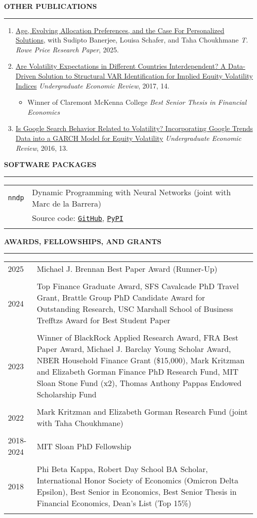 \documentclass[a4paper, 10pt]{article}
\newcounter{mycounter}
\newcommand{\cvsec}[1]
{
	\needspace{2\baselineskip}
	\noindent \textbf{#1}
	
	\vspace{2pt}
	
	\hrule
	
	\bigskip
}
\newcommand{\cvitem}[2]{#1 & #2 \\ & \\}
\newenvironment{cvchrono}[1]
{
	\cvsec{#1}
	\begin{tabu} to \linewidth {X[1,l]X[6,l]} 
}
{
	\end{tabu}
}
\newenvironment{cvcontinue}[1]
{
	\cvsec{#1}
	\begin{enumerate}
		\setcounter{enumi}{\themycounter}
	}
	{
	\setcounter{mycounter}{\theenumi}
	\end{enumerate}
}
\begin{document}
\begin{cvcontinue}{OTHER PUBLICATIONS}
	\item \href{http://timhdesilva.github.io/files/papers/trp_white_paper.pdf}{Age, Evolving Allocation Preferences, and the Case For Personalized Solutions}, with Sudipto Banerjee, Louisa Schafer, and Taha Choukhmane \newline \emph{T. Rowe Price Research Paper}, 2025.
	\item \href{https://digitalcommons.iwu.edu/uer/vol14/iss1/8/}{Are Volatility Expectations in Different Countries Interdependent? A Data-Driven Solution to Structural VAR Identification for Implied Equity Volatility Indices} \newline \emph{Undergraduate Economic Review}, 2017, 14.
	\begin{itemize}
		\item Winner of Claremont McKenna College \emph{Best Senior Thesis in Financial Economics}
	\end{itemize}
	\item \href{https://digitalcommons.iwu.edu/uer/vol13/iss1/13/}{Is Google Search Behavior Related to Volatility? Incorporating Google Trends Data into a GARCH Model for Equity Volatility} \newline \emph{Undergraduate Economic Review}, 2016, 13.\\
\end{cvcontinue}

\begin{cvchrono}{SOFTWARE PACKAGES}
	\cvitem{\texttt{nndp}}{Dynamic Programming with Neural Networks (joint with Marc de la Barrera) \\
	& Source code: \href{https://github.com/marcdelabarrera/nndp}{\texttt{GitHub}}, \href{https://pypi.org/project/nndp/}{\texttt{PyPI}}
	}
\end{cvchrono}

\begin{cvchrono}{AWARDS, FELLOWSHIPS, AND GRANTS}
	\cvitem{2025}{Michael J. Brennan Best Paper Award (Runner-Up)}
	\cvitem{2024}{Top Finance Graduate Award, SFS Cavalcade PhD Travel Grant, Brattle Group PhD Candidate Award for Outstanding Research, USC Marshall School of Business Trefftzs Award for Best Student Paper}
	\cvitem{2023}{Winner of BlackRock Applied Research Award, FRA Best Paper Award, Michael J. Barclay Young Scholar Award, NBER Household Finance Grant (\$15,000), Mark Kritzman and Elizabeth Gorman Finance PhD Research Fund, MIT Sloan Stone Fund (x2), Thomas Anthony Pappas Endowed Scholarship Fund}
	\cvitem{2022}{Mark Kritzman and Elizabeth Gorman Research Fund (joint with Taha Choukhmane)}
	\cvitem{2018-2024}{MIT Sloan PhD Fellowship}
	\cvitem{2018}{Phi Beta Kappa, Robert Day School BA Scholar, International Honor Society of Economics (Omicron Delta Epsilon), Best Senior in Economics, Best Senior Thesis in Financial Economics, Dean's List (Top 15\%)}
\end{cvchrono}
\end{document}
